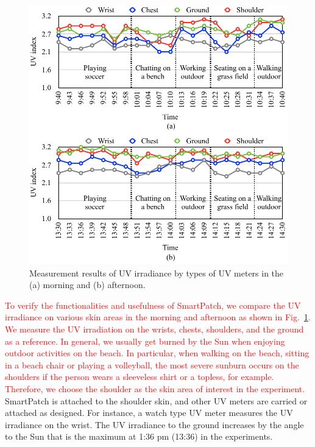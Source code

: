 \documentclass[journal]{IEEEtran}
\begin{document}
\begin{figure}
\centering
\includegraphics[width=1.0\hsize]{Figures/UV_measure.pdf}
\caption{Measurement results of UV irradiance by types of UV meters in the (a) morning and (b) afternoon.}
\label{fig:UV_measure}
\end{figure}

\textcolor{red}{To verify the functionalities and usefulness of SmartPatch, we compare the UV irradiance on various skin areas in the morning and afternoon as shown in Fig.~\ref{fig:UV_measure}. We measure the UV irradiation on the wrists, chests, shoulders, and the ground as a reference.
In general, we usually get burned by the Sun when enjoying outdoor activities on the beach. In particular, when walking on the beach, sitting in a beach chair or playing a volleyball, the most severe sunburn occurs on the shoulders if the person wears a sleeveless shirt or a topless, for example. Therefore, we choose the shoulder as the skin area of interest in the experiment.}
SmartPatch is attached to the shoulder skin, and other UV meters are carried or attached as designed. For instance, a watch type UV meter measures the UV irradiance on the wrist. The UV irradiance to the ground increases by the angle to the Sun that is the maximum at 1:36 pm (13:36) in the experiments.
\end{document}
